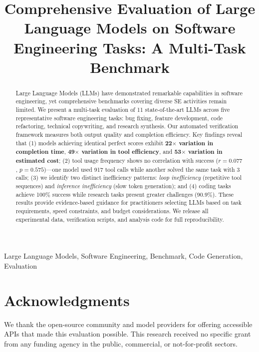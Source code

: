\documentclass[conference]{IEEEtran}
\begin{document}
\title{Comprehensive Evaluation of Large Language Models on Software Engineering Tasks: A Multi-Task Benchmark}

\author{
}

\maketitle

\begin{abstract}
Large Language Models (LLMs) have demonstrated remarkable capabilities in software engineering, yet comprehensive benchmarks covering diverse SE activities remain limited. We present a multi-task evaluation of 11 state-of-the-art LLMs across five representative software engineering tasks: bug fixing, feature development, code refactoring, technical copywriting, and research synthesis. Our automated verification framework measures both output quality and completion efficiency. Key findings reveal that (1) models achieving identical perfect scores exhibit \textbf{22$\times$ variation in completion time}, \textbf{49$\times$ variation in tool efficiency}, and \textbf{53$\times$ variation in estimated cost}; (2) tool usage frequency shows no correlation with success ($r=0.077$, $p=0.575$)---one model used 917 tool calls while another solved the same task with 3 calls; (3) we identify two distinct inefficiency patterns: \textit{loop inefficiency} (repetitive tool sequences) and \textit{inference inefficiency} (slow token generation); and (4) coding tasks achieve 100\% success while research tasks present greater challenges (90.9\%). These results provide evidence-based guidance for practitioners selecting LLMs based on task requirements, speed constraints, and budget considerations. We release all experimental data, verification scripts, and analysis code for full reproducibility.
\end{abstract}

\begin{IEEEkeywords}
Large Language Models, Software Engineering, Benchmark, Code Generation, Evaluation
\end{IEEEkeywords}








\section*{Acknowledgments}
We thank the open-source community and model providers for offering accessible APIs that made this evaluation possible. This research received no specific grant from any funding agency in the public, commercial, or not-for-profit sectors.



\end{document}
